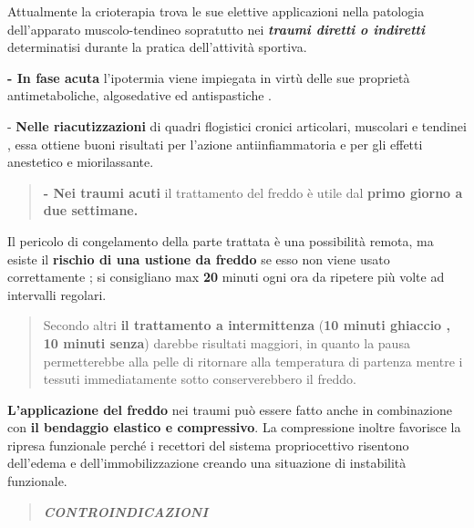 \documentclass[]{article}
\begin{document}
Attualmente la crioterapia trova le sue elettive applicazioni nella
patologia dell'apparato muscolo-tendineo sopratutto nei
\textbf{\emph{traumi diretti o indiretti}} determinatisi durante la
pratica dell'attività sportiva.

\textbf{- In fase acuta} l'ipotermia viene impiegata in virtù delle sue
proprietà antimetaboliche, algosedative ed antispastiche .

- \textbf{Nelle riacutizzazioni} di quadri flogistici cronici
articolari, muscolari e tendinei , essa ottiene buoni risultati per
l'azione antiinfiammatoria e per gli effetti anestetico e miorilassante.

\begin{quote}
\textbf{- Nei traumi acuti} il trattamento del freddo è utile dal
\textbf{primo giorno a due settimane.}
\end{quote}

Il pericolo di congelamento della parte trattata è una possibilità
remota, ma esiste il \textbf{rischio di una ustione da freddo} se esso
non viene usato correttamente ; si consigliano max \textbf{20} minuti
ogni ora da ripetere più volte ad intervalli regolari.

\begin{quote}
Secondo altri \textbf{il trattamento a intermittenza} (\textbf{10 minuti
ghiaccio , 10 minuti senza}) darebbe risultati maggiori, in quanto la
pausa permetterebbe alla pelle di ritornare alla temperatura di partenza
mentre i tessuti immediatamente sotto conserverebbero il freddo.
\end{quote}

\textbf{L'applicazione del freddo} nei traumi può essere fatto anche in
combinazione con \textbf{il bendaggio elastico e compressivo}. La
compressione inoltre favorisce la ripresa funzionale perché i recettori
del sistema propriocettivo risentono dell'edema e dell'immobilizzazione
creando una situazione di instabilità funzionale.

\begin{quote}
\textbf{\emph{CONTROINDICAZIONI}}
\end{quote}
\end{document}
